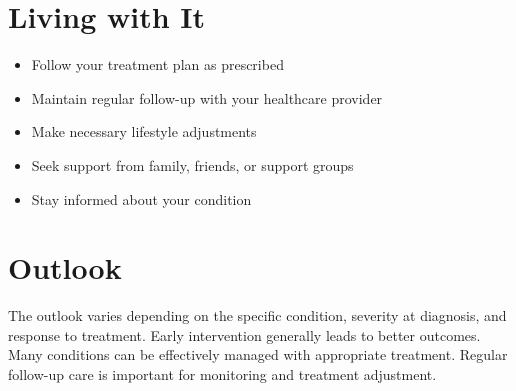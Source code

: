 \section{Living with It}
\begin{itemize}[noitemsep]
  \item Follow your treatment plan as prescribed
  \item Maintain regular follow-up with your healthcare provider
  \item Make necessary lifestyle adjustments
  \item Seek support from family, friends, or support groups
  \item Stay informed about your condition
\end{itemize}
\section{Outlook}
The outlook varies depending on the specific condition, severity at diagnosis, and response to treatment. Early intervention generally leads to better outcomes. Many conditions can be effectively managed with appropriate treatment. Regular follow-up care is important for monitoring and treatment adjustment.
